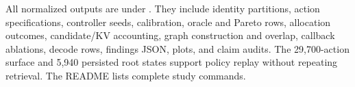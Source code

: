 \documentclass[11pt]{article}
\begin{document}
All normalized outputs are under
. They include identity partitions, action
specifications, controller seeds, calibration, oracle and Pareto rows, allocation outcomes,
candidate/KV accounting, graph construction and overlap, callback ablations, decode rows, findings
JSON, plots, and claim audits. The 29,700-action surface and 5,940 persisted root states support
policy replay without repeating retrieval. The README lists complete study commands.

\small


\end{document}
